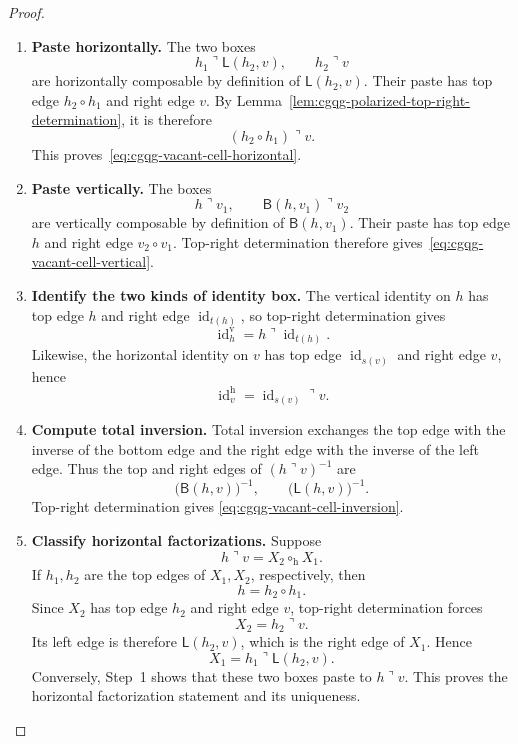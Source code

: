\documentclass[oneside]{article}
\newcommand{\id}{\operatorname{id}}
\newcommand{\trcorner}{\mathbin{\urcorner}}
\newcommand{\leftedge}[2]{\mathsf{L}(#1,#2)}
\newcommand{\bottomedge}[2]{\mathsf{B}(#1,#2)}
\theoremstyle{plain}
\theoremstyle{definition}
\theoremstyle{remark}
\begin{document}
\begin{proof}
    \leavevmode
    \begin{enumerate}[beginpenalty=10000]
        \item \textbf{Paste horizontally.} The two boxes
        \[
            h_1\trcorner\leftedge{h_2}{v},
            \qquad
            h_2\trcorner v
        \]
        are horizontally composable by definition of
        \(\leftedge{h_2}{v}\). Their paste has top edge
        \(h_2\circ h_1\) and right edge \(v\). By
        Lemma~\ref{lem:cgqg-polarized-top-right-determination}, it is
        therefore
        \[
            (h_2\circ h_1)\trcorner v.
        \]
        This proves~\eqref{eq:cgqg-vacant-cell-horizontal}.

        \item \textbf{Paste vertically.}
        The boxes
        \[
            h\trcorner v_1,
            \qquad
            \bottomedge{h}{v_1}\trcorner v_2
        \]
        are vertically composable by definition of
        \(\bottomedge{h}{v_1}\). Their paste has top edge \(h\) and
        right edge \(v_2\circ v_1\). Top-right determination therefore
        gives~\eqref{eq:cgqg-vacant-cell-vertical}.

        \item \textbf{Identify the two kinds of identity box.}
        The vertical identity on \(h\) has top edge \(h\) and right edge
        \(\id_{t(h)}\), so top-right determination gives
        \[
            \id_h^{\mathrm v}
            =
            h\trcorner\id_{t(h)}.
        \]
        Likewise, the horizontal identity on \(v\) has top edge
        \(\id_{s(v)}\) and right edge \(v\), hence
        \[
            \id_v^{\mathrm h}
            =
            \id_{s(v)}\trcorner v.
        \]

        \item \textbf{Compute total inversion.}
        Total inversion exchanges the top edge with the inverse of the
        bottom edge and the right edge with the inverse of the left edge.
        Thus the top and right edges of
        \((h\trcorner v)^{-1}\) are
        \[
            \bigl(\bottomedge{h}{v}\bigr)^{-1},
            \qquad
            \bigl(\leftedge{h}{v}\bigr)^{-1}.
        \]
        Top-right determination gives
        \eqref{eq:cgqg-vacant-cell-inversion}.

        \item \textbf{Classify horizontal factorizations.}
        Suppose
        \[
            h\trcorner v
            =
            X_2\circ_{\mathrm h}X_1.
        \]
        If \(h_1,h_2\) are the top edges of \(X_1,X_2\), respectively,
        then
        \[
            h=h_2\circ h_1.
        \]
        Since \(X_2\) has top edge \(h_2\) and right edge \(v\),
        top-right determination forces
        \[
            X_2=h_2\trcorner v.
        \]
        Its left edge is therefore
        \(\leftedge{h_2}{v}\), which is the right edge of \(X_1\).
        Hence
        \[
            X_1
            =
            h_1\trcorner\leftedge{h_2}{v}.
        \]
        Conversely, Step~1 shows that these two boxes paste to
        \(h\trcorner v\). This proves the horizontal factorization
        statement and its uniqueness.


\end{enumerate}
\end{proof}
\end{document}
